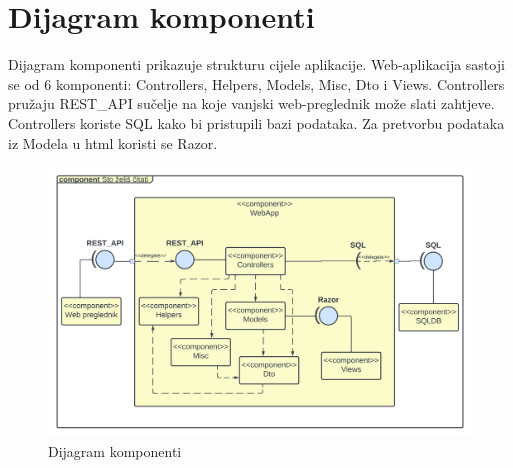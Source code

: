 		\section{Dijagram komponenti}
		
			\raggedright{Dijagram komponenti prikazuje strukturu cijele aplikacije. Web-aplikacija sastoji se od 6 komponenti: Controllers, Helpers, Models, Misc, Dto i Views. Controllers pružaju REST\_API sučelje na koje vanjski web-preglednik može slati zahtjeve. Controllers koriste SQL kako bi pristupili bazi podataka. Za pretvorbu podataka iz Modela u html koristi se Razor.}\\
			
			\begin{figure}[h]
				\centering
				\includegraphics[width = \textwidth]{slike/dijagram_komp.PNG}
				\caption{Dijagram komponenti}
				\label{fig:komponente}
			\end{figure}
			\eject
			